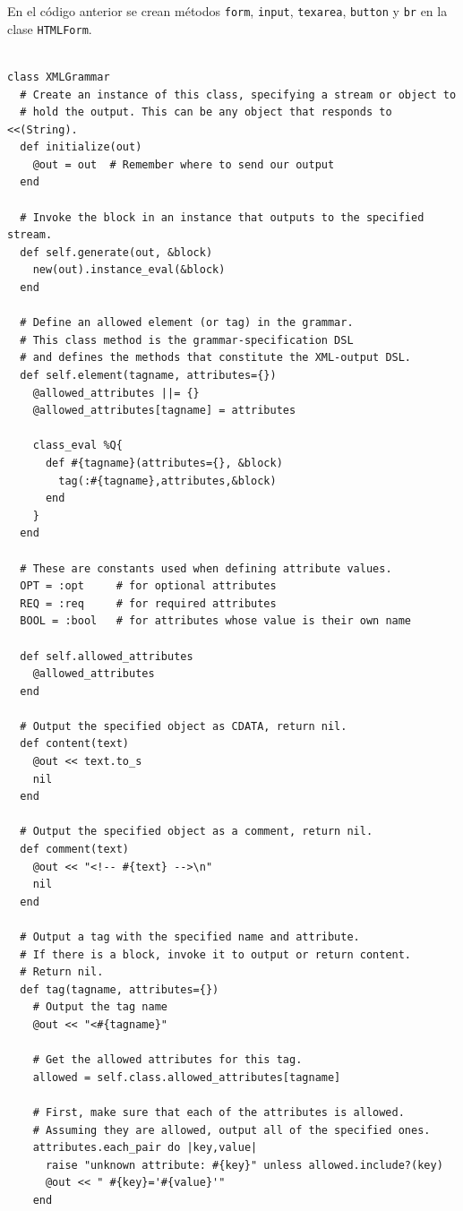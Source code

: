 En el código anterior se crean métodos \verb|form|, \verb|input|, \verb|texarea|, \verb|button|
y \verb|br| en la clase \verb|HTMLForm|.





  \begin{latexonly}
    \begin{lstlisting}

class XMLGrammar
  # Create an instance of this class, specifying a stream or object to
  # hold the output. This can be any object that responds to <<(String).
  def initialize(out)
    @out = out  # Remember where to send our output
  end

  # Invoke the block in an instance that outputs to the specified stream.
  def self.generate(out, &block)
    new(out).instance_eval(&block)
  end

  # Define an allowed element (or tag) in the grammar.
  # This class method is the grammar-specification DSL
  # and defines the methods that constitute the XML-output DSL.
  def self.element(tagname, attributes={})
    @allowed_attributes ||= {}
    @allowed_attributes[tagname] = attributes

    class_eval %Q{
      def #{tagname}(attributes={}, &block)
        tag(:#{tagname},attributes,&block)
      end
    }
  end

  # These are constants used when defining attribute values.
  OPT = :opt     # for optional attributes
  REQ = :req     # for required attributes
  BOOL = :bool   # for attributes whose value is their own name

  def self.allowed_attributes
    @allowed_attributes
  end

  # Output the specified object as CDATA, return nil.
  def content(text)
    @out << text.to_s
    nil
  end

  # Output the specified object as a comment, return nil.
  def comment(text)
    @out << "<!-- #{text} -->\n"
    nil
  end

  # Output a tag with the specified name and attribute.
  # If there is a block, invoke it to output or return content.
  # Return nil.
  def tag(tagname, attributes={})
    # Output the tag name
    @out << "<#{tagname}"

    # Get the allowed attributes for this tag.
    allowed = self.class.allowed_attributes[tagname]

    # First, make sure that each of the attributes is allowed.
    # Assuming they are allowed, output all of the specified ones.
    attributes.each_pair do |key,value|
      raise "unknown attribute: #{key}" unless allowed.include?(key)
      @out << " #{key}='#{value}'"
    end


\end{lstlisting}
\end{latexonly}
